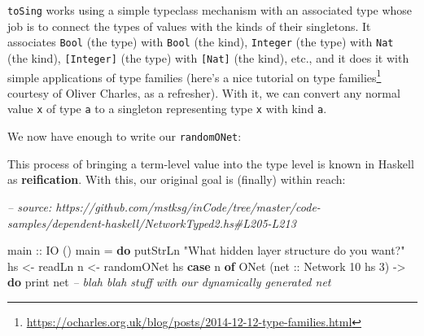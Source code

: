 \documentclass[]{article}
\newenvironment{Shaded}{}{}
\newcommand{\CommentTok}[1]{\textcolor[rgb]{0.38,0.63,0.69}{\textit{#1}}}
\newcommand{\DataTypeTok}[1]{\textcolor[rgb]{0.56,0.13,0.00}{#1}}
\newcommand{\DecValTok}[1]{\textcolor[rgb]{0.25,0.63,0.44}{#1}}
\newcommand{\FunctionTok}[1]{\textcolor[rgb]{0.02,0.16,0.49}{#1}}
\newcommand{\KeywordTok}[1]{\textcolor[rgb]{0.00,0.44,0.13}{\textbf{#1}}}
\newcommand{\NormalTok}[1]{#1}
\newcommand{\OtherTok}[1]{\textcolor[rgb]{0.00,0.44,0.13}{#1}}
\newcommand{\StringTok}[1]{\textcolor[rgb]{0.25,0.44,0.63}{#1}}
\renewcommand{\href}[2]{#2\footnote{\url{#1}}}
\begin{document}
\texttt{toSing} works using a simple typeclass mechanism with an associated type
whose job is to connect the types of values with the kinds of their singletons.
It associates \texttt{Bool} (the type) with \texttt{Bool} (the kind),
\texttt{Integer} (the type) with \texttt{Nat} (the kind), \texttt{{[}Integer{]}}
(the type) with \texttt{{[}Nat{]}} (the kind), etc., and it does it with simple
applications of type families (here's a
\href{https://ocharles.org.uk/blog/posts/2014-12-12-type-families.html}{nice
tutorial on type families} courtesy of Oliver Charles, as a refresher). With it,
we can convert any normal value \texttt{x} of type \texttt{a} to a singleton
representing type \texttt{x} with kind \texttt{a}.

We now have enough to write our \texttt{randomONet}:

\begin{Shaded}
\end{Shaded}

This process of bringing a term-level value into the type level is known in
Haskell as \textbf{reification}. With this, our original goal is (finally)
within reach:

\begin{Shaded}
\begin{Highlighting}[]
\CommentTok{-- source: https://github.com/mstksg/inCode/tree/master/code-samples/dependent-haskell/NetworkTyped2.hs#L205-L213}

\OtherTok{main ::} \DataTypeTok{IO}\NormalTok{ ()}
\NormalTok{main }\FunctionTok{=} \KeywordTok{do}
\NormalTok{    putStrLn }\StringTok{"What hidden layer structure do you want?"}
\NormalTok{    hs }\OtherTok{<-}\NormalTok{ readLn}
\NormalTok{    n  }\OtherTok{<-}\NormalTok{ randomONet hs}
    \KeywordTok{case}\NormalTok{ n }\KeywordTok{of}
      \DataTypeTok{ONet}\NormalTok{ (}\OtherTok{net ::} \DataTypeTok{Network} \DecValTok{10}\NormalTok{ hs }\DecValTok{3}\NormalTok{) }\OtherTok{->} \KeywordTok{do}
\NormalTok{        print net}
        \CommentTok{-- blah blah stuff with our dynamically generated net}
\end{Highlighting}
\end{Shaded}
\end{document}
